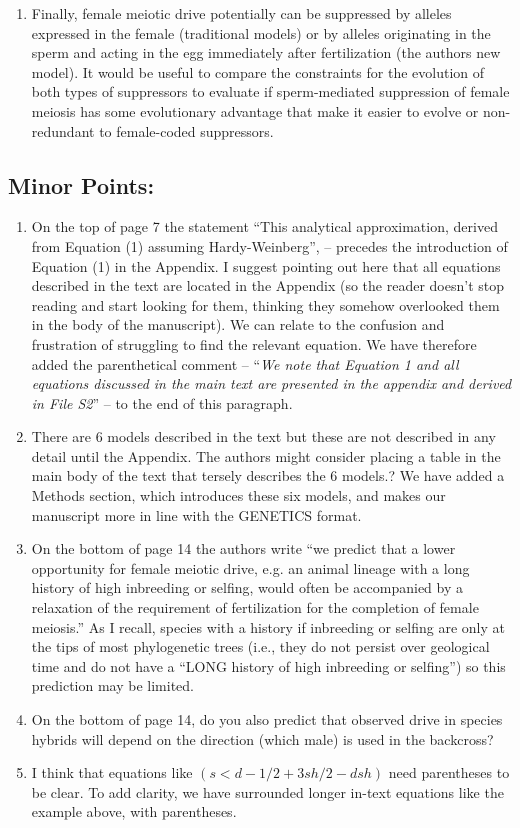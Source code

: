 \documentclass[12pt,letterpaper]{article}
\newcommand{\yb}[1]{{ \color{blue} #1}}
\begin{document}
\begin{enumerate}
\item	Finally, female meiotic drive potentially can be suppressed by alleles
expressed in the female (traditional models) or by alleles originating in the
sperm and acting in the egg immediately after fertilization (the authors new
model).  It would be useful to compare the constraints for the evolution of both
types of suppressors to evaluate if sperm-mediated suppression of female meiosis
has some evolutionary advantage that make it easier to evolve or non-redundant
to female-coded suppressors.
\end{enumerate}

\subsection*{Minor Points:}
\begin{enumerate}
\item   On the top of page 7 the statement ``This analytical approximation, derived
from Equation (1) assuming Hardy-Weinberg'', -- precedes the introduction of
Equation (1) in the Appendix.  I suggest pointing out here that all equations
described in the text are located in the Appendix (so the reader doesn't stop
reading and start looking for them, thinking they somehow overlooked them in the
body of the manuscript).
\yb{We can relate to the confusion and frustration of struggling to find the relevant equation. We have therefore added the parenthetical comment --   ``\emph{We note that Equation 1 and all equations discussed in the main text are presented in the appendix and derived in File S2}'' -- to the end of this paragraph.}


\item There are 6 models described in the text but these are not described in any
detail until the Appendix.  The authors might consider placing a table in the
main body of the text that tersely describes the 6 models.?
\yb{We have added a Methods section, which introduces these six models, and makes our manuscript more in line with the GENETICS format.}

\item On the bottom of page 14 the authors write ``we predict that a lower
opportunity for female meiotic drive, e.g. an animal lineage with a long history
of high inbreeding or selfing, would often be accompanied by a relaxation of the
requirement of fertilization for the completion of female meiosis.''  As I
recall, species with a history if inbreeding or selfing are only at the tips of
most phylogenetic trees (i.e., they do not persist over geological time and do
not have a ``LONG history of high inbreeding or selfing'') so this prediction may
be limited. 

\item On the bottom of page 14, do you also predict that observed drive in species
hybrids will depend on the direction (which male) is used in the backcross?

\item I think that equations like $(s < d -1/2 + 3sh/2 - dsh)$ need parentheses to be
clear. 
\yb{To add clarity, we have surrounded longer in-text equations like the example above, with parentheses.}

\end{enumerate}
\end{document}
